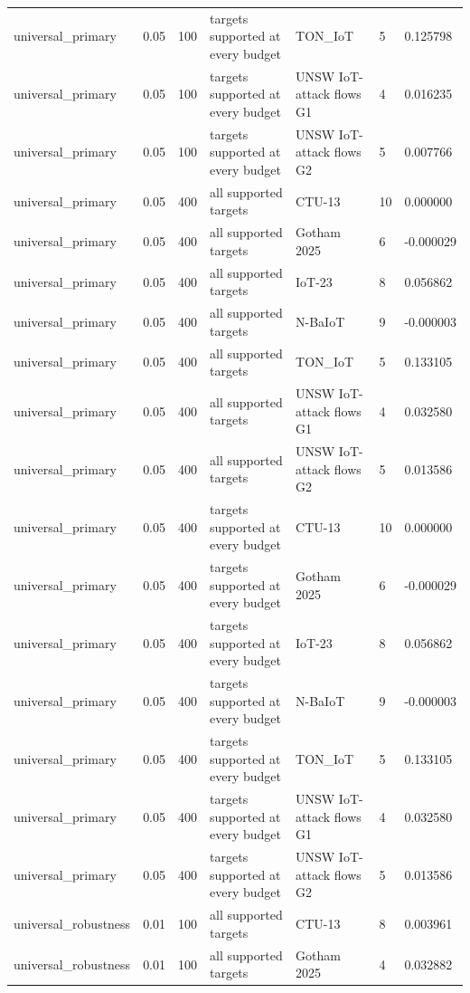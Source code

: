 \begin{tabular}{lllllll}
universal\_primary & 0.05 & 100 & targets supported at every budget & TON\_IoT & 5 & 0.125798 \\
universal\_primary & 0.05 & 100 & targets supported at every budget & UNSW IoT-attack flows G1 & 4 & 0.016235 \\
universal\_primary & 0.05 & 100 & targets supported at every budget & UNSW IoT-attack flows G2 & 5 & 0.007766 \\
universal\_primary & 0.05 & 400 & all supported targets & CTU-13 & 10 & 0.000000 \\
universal\_primary & 0.05 & 400 & all supported targets & Gotham 2025 & 6 & -0.000029 \\
universal\_primary & 0.05 & 400 & all supported targets & IoT-23 & 8 & 0.056862 \\
universal\_primary & 0.05 & 400 & all supported targets & N-BaIoT & 9 & -0.000003 \\
universal\_primary & 0.05 & 400 & all supported targets & TON\_IoT & 5 & 0.133105 \\
universal\_primary & 0.05 & 400 & all supported targets & UNSW IoT-attack flows G1 & 4 & 0.032580 \\
universal\_primary & 0.05 & 400 & all supported targets & UNSW IoT-attack flows G2 & 5 & 0.013586 \\
universal\_primary & 0.05 & 400 & targets supported at every budget & CTU-13 & 10 & 0.000000 \\
universal\_primary & 0.05 & 400 & targets supported at every budget & Gotham 2025 & 6 & -0.000029 \\
universal\_primary & 0.05 & 400 & targets supported at every budget & IoT-23 & 8 & 0.056862 \\
universal\_primary & 0.05 & 400 & targets supported at every budget & N-BaIoT & 9 & -0.000003 \\
universal\_primary & 0.05 & 400 & targets supported at every budget & TON\_IoT & 5 & 0.133105 \\
universal\_primary & 0.05 & 400 & targets supported at every budget & UNSW IoT-attack flows G1 & 4 & 0.032580 \\
universal\_primary & 0.05 & 400 & targets supported at every budget & UNSW IoT-attack flows G2 & 5 & 0.013586 \\
universal\_robustness & 0.01 & 100 & all supported targets & CTU-13 & 8 & 0.003961 \\
universal\_robustness & 0.01 & 100 & all supported targets & Gotham 2025 & 4 & 0.032882 \\

\end{tabular}
